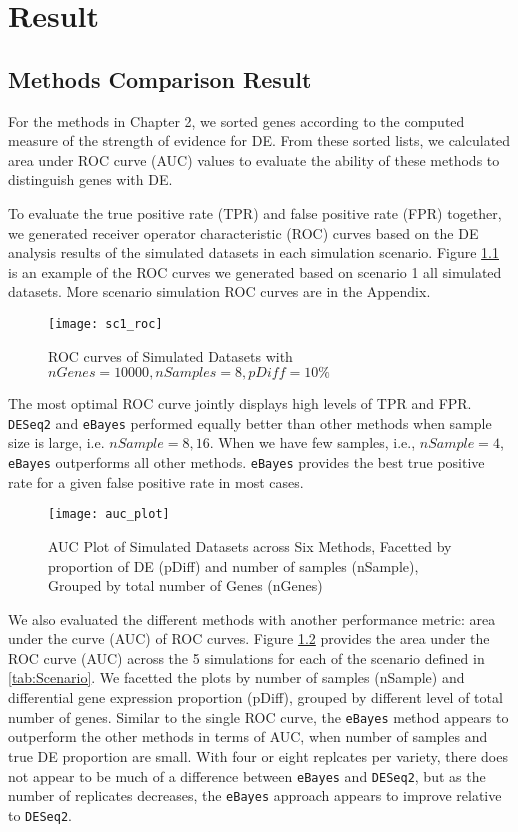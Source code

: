 \chapter{Result}

\section{Methods Comparison Result}

For the methods in Chapter 2, we sorted genes according to the computed measure of the strength of evidence for DE. From these sorted lists, we calculated area under ROC curve (AUC) values to evaluate the ability of these methods to distinguish genes with DE. 

To evaluate the true positive rate (TPR) and false positive rate (FPR) together, we generated receiver operator characteristic (ROC) curves based on the DE analysis results of the simulated datasets in each simulation scenario. Figure \ref{sc1_roc} is an example of the ROC curves we generated based on scenario 1 all simulated datasets. More scenario simulation ROC curves are in the Appendix. 

\begin{figure}[h!tb] 
\texttt{[image: sc1\_roc]}
\caption{ROC curves of Simulated Datasets with $nGenes=10000, nSamples=8, pDiff=10\%$}
\label{sc1_roc}
\end{figure}



The most optimal ROC curve jointly displays high levels of TPR and FPR. {\tt DESeq2} and \texttt{eBayes} performed equally better than other methods when sample size is large, i.e. $nSample = 8, 16$. When we have few samples, i.e., $nSample=4$, \texttt{eBayes} outperforms all other methods. \texttt{eBayes} provides the best true positive rate for a given false positive rate in most cases. 

\begin{figure}[h!tb] 
\texttt{[image: auc\_plot]}
\caption{AUC Plot of Simulated Datasets across Six Methods, Facetted by proportion of DE (pDiff) and number of samples (nSample), Grouped by total number of Genes (nGenes)}
\label{auc}
\end{figure}


We also evaluated the different methods with another performance metric: area under the curve (AUC) of ROC curves. Figure \ref{auc} provides the area under the ROC curve (AUC) across the 5 simulations for each of the scenario defined in \ref{tab:Scenario}. We facetted the plots by number of samples (nSample) and differential gene expression proportion (pDiff), grouped by different level of total number of genes. Similar to the single ROC curve, the \texttt{eBayes} method appears to outperform the other methods in terms of AUC, when number of samples and true DE proportion are small. With four or eight replcates per variety, there does not appear to be much of a difference between \texttt{eBayes} and {\tt DESeq2}, but as the number of replicates decreases, the \texttt{eBayes} approach appears to improve relative to {\tt DESeq2}.



